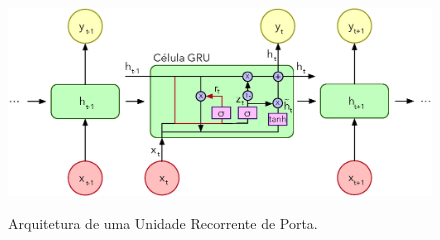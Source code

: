 \begin{frame}
	\begin{figure}[!ht]
		\centering
		\includegraphics[scale=0.4]{figs/gru.eps}	
		\label{f.gru}
		\caption{Arquitetura de uma Unidade Recorrente de Porta.}
	\end{figure}
\end{frame}